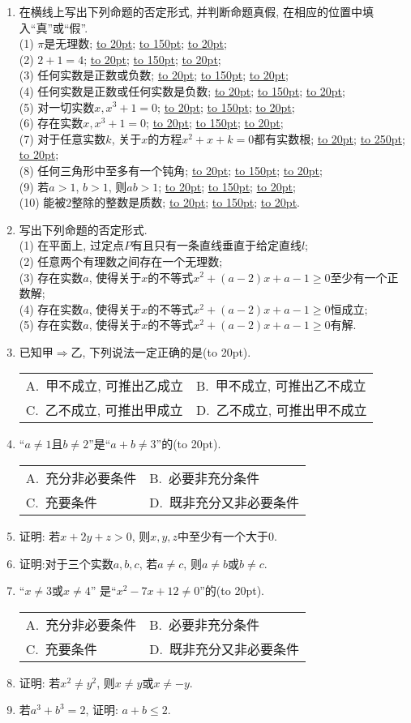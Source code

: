 \documentclass[10pt,a4paper]{article}
\newcommand{\blank}[1]{\underline{\hbox to #1pt{}}}
\newcommand{\bracket}[1]{(\hbox to #1pt{})}
\newcommand{\twoch}[4]{\par\begin{tabular}{p{.46\textwidth}p{.46\textwidth}}
A.~#1& B.~#2\\
C.~#3& D.~#4
\end{tabular}}
\begin{document}
\begin{enumerate}[1.]
(10) $a,b,c,d$都不大于$1$; \blank{100}. 
\item 在横线上写出下列命题的否定形式, 并判断命题真假, 在相应的位置中填入``真''或``假''.\\
(1) $\pi$是无理数; \blank{20}; \blank{150}; \blank{20};\\
(2) $2+1=4$;  \blank{20}; \blank{150}; \blank{20};\\
(3) 任何实数是正数或负数;  \blank{20}; \blank{150}; \blank{20};\\
(4) 任何实数是正数或任何实数是负数;  \blank{20}; \blank{150}; \blank{20};\\
(5) 对一切实数$x, x^3+1=0$;  \blank{20}; \blank{150}; \blank{20};\\
(6) 存在实数$x, x^3+1=0$;  \blank{20}; \blank{150}; \blank{20};\\
(7) 对于任意实数$k$, 关于$x$的方程$x^2+x+k=0$都有实数根;  \blank{20}; \blank{250}; \blank{20};\\
(8) 任何三角形中至多有一个钝角;  \blank{20}; \blank{150}; \blank{20};\\
(9) 若$a>1$, $b>1$, 则$ab>1$;  \blank{20}; \blank{150}; \blank{20};\\
(10) 能被$2$整除的整数是质数;  \blank{20}; \blank{150}; \blank{20}.\\
\item 写出下列命题的否定形式.\\
(1) 在平面上, 过定点$P$有且只有一条直线垂直于给定直线$l$;\\
(2) 任意两个有理数之间存在一个无理数;\\
(3) 存在实数$a$, 使得关于$x$的不等式$x^2+(a-2)x+a-1\ge 0$至少有一个正数解;\\
(4) 存在实数$a$, 使得关于$x$的不等式$x^2+(a-2)x+a-1\ge 0$恒成立;\\
(5) 存在实数$a$, 使得关于$x$的不等式$x^2+(a-2)x+a-1\ge 0$有解.
\item 已知甲$\Rightarrow$乙, 下列说法一定正确的是\bracket{20}.
\twoch{甲不成立, 可推出乙成立}{甲不成立, 可推出乙不成立}{乙不成立, 可推出甲成立}{乙不成立, 可推出甲不成立}
\item ``$a\ne 1$且$b\ne 2$''是``$a+b\ne 3$''的\bracket{20}.
\twoch{充分非必要条件}{必要非充分条件}{充要条件}{既非充分又非必要条件}
\item 证明: 若$x+2y+z>0$, 则$x,y,z$中至少有一个大于$0$.
\item 证明:对于三个实数$a,b,c$, 若$a\ne c$, 则$a\ne b$或$b\ne c$.
\item ``$x\ne 3$或$x\ne 4$'' 是``$x^2-7x+12\ne 0$''的\bracket{20}.
\twoch{充分非必要条件}{必要非充分条件}{充要条件}{既非充分又非必要条件}
\item 证明: 若$x^2\ne y^2$, 则$x\ne y$或$x\ne -y$.
\item 若$a^3+b^3=2$, 证明: $a+b\le 2$.


\end{enumerate}
\end{document}
